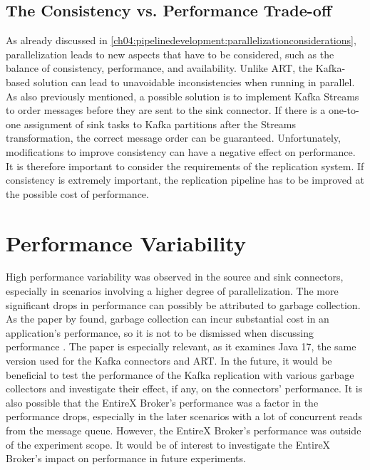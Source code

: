\subsection{The Consistency vs. Performance Trade-off}
As already discussed in \ref{ch04:pipelinedevelopment:parallelizationconsiderations}, parallelization leads to new aspects that have to be considered, such as the balance of consistency, performance, and availability. Unlike \ac{ART}, the Kafka-based solution can lead to unavoidable inconsistencies when running in parallel. As also previously mentioned, a possible solution is to implement Kafka Streams to order messages before they are sent to the sink connector. If there is a one-to-one assignment of sink tasks to Kafka partitions after the Streams transformation, the correct message order can be guaranteed. Unfortunately, modifications to improve consistency can have a negative effect on performance. It is therefore important to consider the requirements of the replication system. If consistency is extremely important, the replication pipeline has to be improved at the possible cost of performance.

\section{Performance Variability}
\label{ch07:discussion:performancevariability}
High performance variability was observed in the source and sink connectors, especially in scenarios involving a higher degree of parallelization. The more significant drops in performance can possibly be attributed to garbage collection. As the paper by \citeauthor{cai2022distillinggc} found, garbage collection can incur substantial cost in an application's performance, so it is not to be dismissed when discussing performance \cite{cai2022distillinggc}. The paper is especially relevant, as it examines Java 17, the same version used for the Kafka connectors and \ac{ART}. In the future, it would be beneficial to test the performance of the Kafka replication with various garbage collectors and investigate their effect, if any, on the connectors' performance.
It is also possible that the EntireX Broker's performance was a factor in the performance drops, especially in the later scenarios with a lot of concurrent reads from the message queue. However, the EntireX Broker's performance was outside of the experiment scope. It would be of interest to investigate the EntireX Broker's impact on performance in future experiments.

